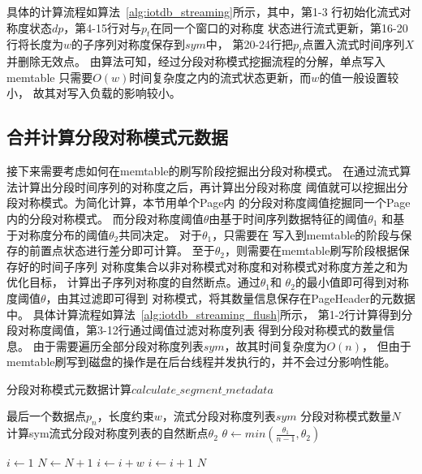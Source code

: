 具体的计算流程如算法~\ref{alg:iotdb_streaming}所示，其中，第1-3
行初始化流式对称度状态$dp$，第4-15行对与$p_t$在同一个窗口的对称度
状态进行流式更新，第16-20行将长度为$w$的子序列对称度保存到$sym$中，
第20-24行把$p_t$点置入流式时间序列$X$并删除无效点。
由算法可知，经过分段对称模式挖掘流程的分解，单点写入memtable
只需要$O(w)$时间复杂度之内的流式状态更新，而$w$的值一般设置较小，
故其对写入负载的影响较小。

\subsection{合并计算分段对称模式元数据}

接下来需要考虑如何在memtable的刷写阶段挖掘出分段对称模式。
在通过流式算法计算出分段时间序列的对称度之后，再计算出分段对称度
阈值就可以挖掘出分段对称模式。为简化计算，本节用单个Page内
的分段对称度阈值挖掘同一个Page内的分段对称模式。
而分段对称度阈值$\theta$由基于时间序列数据特征的阈值$\theta_1$
和基于对称度分布的阈值$\theta_2$共同决定。
对于$\theta_1$，只需要在
写入到memtable的阶段与保存的前置点状态进行差分即可计算。
至于$\theta_2$，则需要在memtable刷写阶段根据保存好的时间子序列
对称度集合以非对称模式对称度和对称模式对称度方差之和为优化目标，
计算出子序列对称度的自然断点。通过$\theta_1$和
$\theta_2$的最小值即可得到对称度阈值$\theta$，由其过滤即可得到
对称模式，将其数量信息保存在PageHeader的元数据中。
具体计算流程如算法~\ref{alg:iotdb_streaming_flush}所示，
第1-2行计算得到分段对称度阈值，第3-12行通过阈值过滤对称度列表
得到分段对称模式的数量信息。
由于需要遍历全部分段对称度列表$sym$，故其时间复杂度为$O(n)$，
但由于memtable刷写到磁盘的操作是在后台线程并发执行的，并不会过分影响性能。

\renewcommand{\algorithmicrequire}{\textbf{输入：}\unskip}
\renewcommand{\algorithmicensure}{\textbf{输出：}\unskip}

\begin{algorithm}
  \caption{分段对称模式元数据计算$calculate\_segment\_metadata$}
  \label{alg:iotdb_streaming_flush}
  \small
  \begin{algorithmic}
    \REQUIRE 最后一个数据点$p_n$，长度约束$w$，流式分段对称度列表$sym$
    \ENSURE 分段对称模式数量$N$
    \STATE 计算sym流式分段对称度列表的自然断点$\theta_2$
    \STATE $\theta \leftarrow min(\frac{\theta_1}{n-1},\theta_2)$

    \STATE $i \leftarrow 1$
    \STATE $N \leftarrow N+1$
    \STATE $i \leftarrow i+w$
    \ELSE
    \STATE $i \leftarrow i+1$
    \ENDIF
    \ENDWHILE
    \RETURN $N$
  \end{algorithmic}
\end{algorithm}

